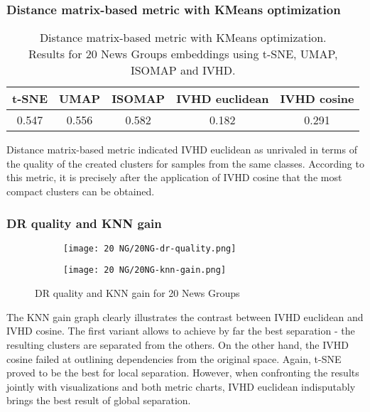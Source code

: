 \documentclass[12pt]{article}
\begin{document}
\subsubsection{Distance matrix-based metric with KMeans optimization}
\begin{table}[h]
\centering
\caption{Distance matrix-based metric with KMeans optimization. \\ Results for 20 News Groups embeddings using t-SNE, UMAP, ISOMAP and IVHD.}
\begin{tabular}{|c|c|l|l|l|}
\hline
\textbf{t-SNE} & \textbf{UMAP} & \textbf{ISOMAP}            & \textbf{IVHD euclidean}    & \textbf{IVHD cosine}       \\ \hline
0.547          & 0.556         & \multicolumn{1}{c|}{0.582} & \multicolumn{1}{c|}{0.182} & \multicolumn{1}{c|}{0.291} \\ \hline
\end{tabular}
\end{table}
Distance matrix-based metric indicated IVHD euclidean as unrivaled in terms of the quality of the created clusters for samples from the same classes. According to this metric, it is precisely after the application of IVHD cosine that the most compact clusters can be obtained.

\clearpage
\subsubsection{DR quality and KNN gain}
\begin{figure}[h]
\centering
\begin{subfigure}{.5\textwidth}
  \centering
  \texttt{[image: 20 NG/20NG-dr-quality.png]}
  \label{fig:sub1}
\end{subfigure}%
\begin{subfigure}{.5\textwidth}
  \centering
  \texttt{[image: 20 NG/20NG-knn-gain.png]}
  \label{fig:sub2}
\end{subfigure}
\caption{DR quality and KNN gain for 20 News Groups}
\label{fig:test}
\end{figure}
The KNN gain graph clearly illustrates the contrast between IVHD euclidean and IVHD cosine. The first variant allows to achieve by far the best separation - the resulting clusters are separated from the others. On the other hand, the IVHD cosine failed at outlining dependencies from the original space. Again, t-SNE proved to be the best for local separation. However, when confronting the results jointly with visualizations and both metric charts, IVHD euclidean indisputably brings the best result of global separation.
\end{document}
